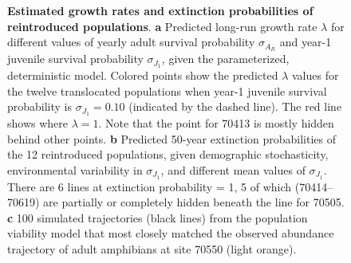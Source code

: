 \documentclass[
  letterpaper,
  DIV=11,
  numbers=noendperiod]{scrartcl}
\begin{document}
\begin{figure}


\caption{\label{fig-viability}\textbf{Estimated growth rates and
extinction probabilities of reintroduced populations}. \textbf{a}
Predicted long-run growth rate \(\lambda\) for different values of
yearly adult survival probability \(\sigma_{A_R}\) and year-1 juvenile
survival probability \(\sigma_{J_1}\), given the parameterized,
deterministic model. Colored points show the predicted \(\lambda\)
values for the twelve translocated populations when year-1 juvenile
survival probability is \(\sigma_{J_1} = 0.10\) (indicated by the dashed
line). The red line shows where \(\lambda = 1\). Note that the point for
70413 is mostly hidden behind other points. \textbf{b} Predicted 50-year
extinction probabilities of the 12 reintroduced populations, given
demographic stochasticity, environmental variability in
\(\sigma_{J_1}\), and different mean values of \(\sigma_{J_1}\). There
are 6 lines at extinction probability = 1, 5 of which (70414--70619) are
partially or completely hidden beneath the line for 70505. \textbf{c}
100 simulated trajectories (black lines) from the population viability
model that most closely matched the observed abundance trajectory of
adult amphibians at site 70550 (light orange).}

\end{figure}%
\end{document}
